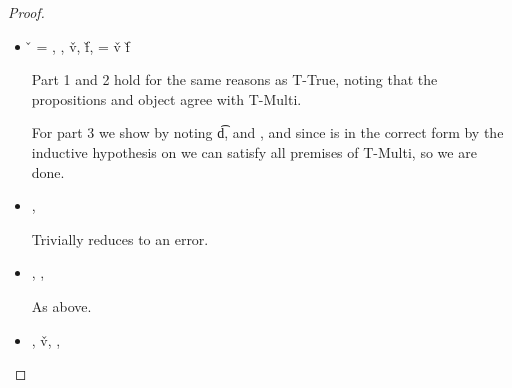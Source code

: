 \begin{lemma}
\begin{proof}
\begin{case}[T-DefMethod]
  \begin{itemize}
    \item[]
      \begin{subcase}[B-DefMethod]
       \v{} = { {\disptablep{}}},
        \opsem {\openv{}}
               {}
               { {\disptable{}}},
  \opsem {\openv{}}
         {}
         {\v{v}},
  \opsem {\openv{}}
         {}
         {\v{f}},
         \disptablep{} = {\extenddisptable {\disptable{}} 
                                {\v{v}}
                                {\v{f}}}

                                Part 1 and 2 hold for the same reasons as T-True, noting that the propositions
                                and object agree with T-Multi.

For part 3 we show
by noting \judgementtwo {} { {\t{d}}},
  and
  , and since \disptable{} is in the correct form by the inductive
  hypothesis on {} we can satisfy all premises of T-Multi, so we are done.


      \end{subcase}

    \item[]
      \begin{subcase}[BE-DefMethod1]
        \opsem {\openv{}}
               {}
               {\errorval{\v{}}},
        \opsem {\openv{}}
                  {\e{}}
                {\errorval{\v{}}}

                Trivially reduces to an error.

      \end{subcase}
    \item[]
      \begin{subcase}[BE-DefMethod2]
        \opsem {\openv{}}
         {}
         { {\disptable{}}},
  \opsem {\openv{}}
         {}
         {\errorval{\v{}}},
        \opsem {\openv{}}
                  {\e{}}
                {\errorval{\v{}}}

                As above.
      \end{subcase}
    \item[]
      \begin{subcase}[BE-DefMethod3]
        \opsem {\openv{}}
         {}
         { {\disptable{}}},
  \opsem {\openv{}}
         {}
         {\v{v}},
  \opsem {\openv{}}
         {}
         {\errorval{\v{}}},
        \opsem {\openv{}}
                  {\e{}}
                {\errorval{\v{}}}


\end{subcase}
\end{itemize}
\end{case}
\end{proof}
\end{lemma}
